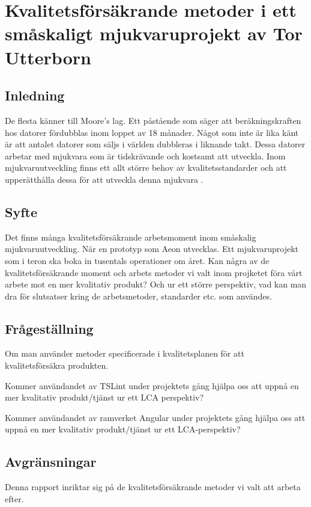 \chapter{Kvalitetsförsäkrande metoder i ett småskaligt mjukvaruprojekt av Tor Utterborn}

\section{Inledning}

De flesta känner till Moore's lag. Ett påstående som säger att beräkningskraften hos datorer fördubblas inom loppet av 18 månader. 
Något som inte är lika känt är att antalet datorer som säljs i världen dubbleras i liknande takt. \cite{greenbiz}
Dessa datorer arbetar med mjukvara som är tidskrävande och kostsamt att utveckla. Inom mjukvaruutveckling finns ett allt större behov av kvalitetsstandarder och att upperätthålla dessa för att utveckla denna mjukvara \cite{linkedin}.

\section{Syfte}

Det finns många kvalitetsförsäkrande arbetsmoment inom småskalig mjukvaruutveckling. När en prototyp som Aeon utvecklas. Ett mjukvaruprojekt som i teron ska boka in tusentals operationer om året. Kan några av de kvalitetsförsäkrande moment och arbets metoder vi valt inom projketet föra vårt arbete mot en mer kvalitativ produkt? Och ur ett större perspektiv, vad kan man dra för slutsatser kring de arbetsmetoder, standarder etc. som användes.

\section{Frågeställning}

Om man använder metoder specificerade i kvalitetsplanen för att kvalitetsförsäkra produkten. 

Kommer användandet av TSLint under projektets gång hjälpa oss att uppnå en mer kvalitativ produkt/tjänst ur ett LCA perspektiv?

Kommer användandet av ramverket Angular under projektets gång hjälpa oss att uppnå en mer kvalitativ produkt/tjänst ur ett LCA-perspektiv?

\section{Avgränsningar}
Denna rapport inriktar sig på de kvalitetsförsäkrande metoder vi valt att arbeta efter.

